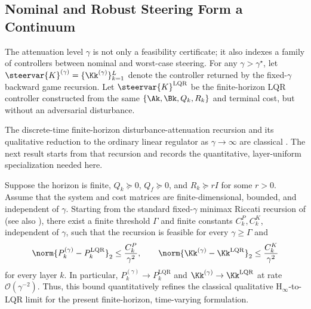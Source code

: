 

\subsection{Nominal and Robust Steering Form a Continuum}
\label{sec:robustness-continuum}

The attenuation level $\gamma$ is not only a feasibility certificate; it also
indexes a family of controllers between nominal and worst-case steering.  For
any $\gamma>\gamma^\star$, let
$\steervar{K}^{(\gamma)}=\{\Kk^{(\gamma)}\}_{k=1}^{L}$ denote the controller
returned by the fixed-$\gamma$ backward game recursion.  Let
$\steervar{K}^{\mathrm{LQR}}$ be the finite-horizon LQR controller constructed
from the same $\{\Ak,\Bk,Q_k,R_k\}$ and terminal cost, but without an
adversarial disturbance.

The discrete-time finite-horizon disturbance-attenuation recursion and its
qualitative reduction to the ordinary linear regulator as
$\gamma\to\infty$ are classical
\citep{basar1991dynamic,hassibi1999indefinite}. The next result starts from
that recursion and records the quantitative, layer-uniform specialization
needed here.

\begin{proposition}
\label{prop:lqr-limit}
Suppose the horizon is finite,
$Q_k\succeq0$, $Q_f\succeq0$, and $R_k\succeq rI$ for some $r>0$.
Assume that the system and cost matrices are finite-dimensional, bounded, and
independent of $\gamma$. Starting from the standard fixed-$\gamma$ minimax
Riccati recursion of \citet{basar1991dynamic} (see also
\citet[Ch.~9]{hassibi1999indefinite}), there exist a finite threshold
$\Gamma$ and finite constants $C_k^P,C_k^K$, independent of $\gamma$, such
that the recursion is feasible for every $\gamma\geq\Gamma$ and
$$
\norm{P_k^{(\gamma)}-P_k^{\mathrm{LQR}}}_2
\leq
\frac{C_k^P}{\gamma^2},
\qquad
\norm{\Kk^{(\gamma)}-\Kk^{\mathrm{LQR}}}_2
\leq
\frac{C_k^K}{\gamma^2}
$$
for every layer $k$.  In particular,
$P_k^{(\gamma)}\to P_k^{\mathrm{LQR}}$ and
$\Kk^{(\gamma)}\to\Kk^{\mathrm{LQR}}$ at rate
$\mathcal{O}(\gamma^{-2})$. Thus, this bound quantitatively refines the
classical qualitative $\mathrm{H}_{\infty}$-to-LQR limit for the present
finite-horizon, time-varying formulation.
\end{proposition}

